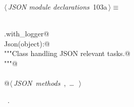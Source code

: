 \documentclass[
    a4paper,      %
    10pt,         %
    openright,    %
    notitlepage,  %
    parskip=half, %
]{scrreprt}       %
\theoremstyle{definition}                    %
\begin{document}
\begin{flushleft} \small
\begin{minipage}{\linewidth}\label{scrap167}\raggedright\small
{} $\langle\,${\itshape JSON module declarations}\nobreak\ {\footnotesize {103a}}$\,\rangle\equiv$
\vspace{-1exm}
\begin{list}{}{} \item
\mbox{}\lstinline@@\\
\mbox{}\lstinline@common.with_logger@\\
\mbox{}\lstinline@class Json(object):@\\
\mbox{}\lstinline@    """Class handling JSON relevant tasks.@\\
\mbox{}\lstinline@    """@\\
\mbox{}\lstinline@@\\
\mbox{}\lstinline@    @\hbox{$\langle\,${\itshape JSON methods}\nobreak\ {\footnotesize {}, \ldots\ }$\,\rangle$}\lstinline@@\\
\mbox{}\lstinline@@{\NWsep}
\end{list}
\vspace{-1.5ex}
\footnotesize
\begin{list}{}{\setlength{\itemsep}{-\parsep}\setlength{\itemindent}{-\leftmargin}}
\item \NWtxtMacroRefIn\ .

\item{}
\end{list}
\end{minipage}\vspace{4ex}
\end{flushleft}
\end{document}
